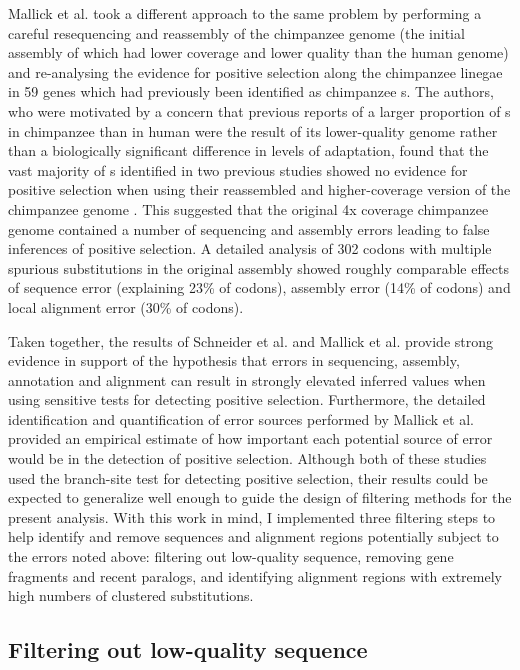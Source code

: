 Mallick et al. \citeyearpar{Mallick2009} took a different approach to
the same problem by performing a careful resequencing and reassembly
of the chimpanzee genome (the initial assembly of which had lower
coverage and lower quality than the human genome) and re-analysing the
evidence for positive selection along the chimpanzee linegae in 59
genes which had previously been identified as chimpanzee \psg{}s. The
authors, who were motivated by a concern that previous reports of a
larger proportion of \psg{}s in chimpanzee than in human
\citep{Bakewell2007} were the result of its lower-quality genome
rather than a biologically significant difference in levels of
adaptation, found that the vast majority of \psg{}s identified in two
previous studies showed no evidence for positive selection when using
their reassembled and higher-coverage version of the chimpanzee genome
\citep{Mallick2009}. This suggested that the original 4x coverage
chimpanzee genome contained a number of sequencing and assembly errors
leading to false inferences of positive selection. A detailed analysis
of 302 codons with multiple spurious \nsyn substitutions in the
original assembly showed roughly comparable effects of sequence error
(explaining 23\% of codons), assembly error (14\% of codons) and local
alignment error (30\% of codons).

Taken together, the results of Schneider et
al. \citeyearpar{Schneider2009} and Mallick et
al. \citeyearpar{Mallick2009} provide strong evidence in support of
the hypothesis that errors in sequencing, assembly, annotation and
alignment can result in strongly elevated inferred \omg values when
using sensitive tests for detecting positive selection. Furthermore,
the detailed identification and quantification of error sources
performed by Mallick et al. \citeyearpar{Mallick2009} provided an
empirical estimate of how important each potential source of error
would be in the detection of positive selection. Although both of
these studies used the branch-site test for detecting positive
selection, their results could be expected to generalize well enough
to guide the design of filtering methods for the present \sw
analysis. With this work in mind, I implemented three filtering steps
to help identify and remove sequences and alignment regions
potentially subject to the errors noted above: filtering out
low-quality sequence, removing gene fragments and recent paralogs, and
identifying alignment regions with extremely high numbers of clustered
substitutions.

\subsection{Filtering out low-quality sequence}

